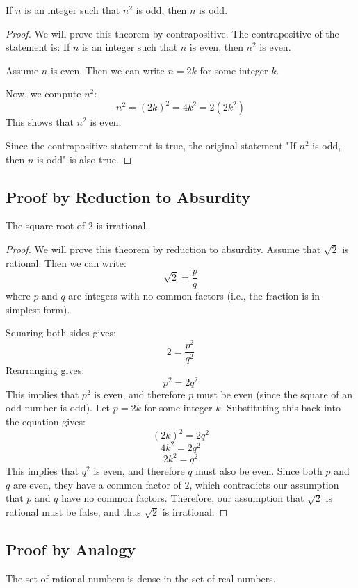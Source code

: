 If \( n \) is an integer such that \( n^2 \) is odd, then \( n \) is odd.

\begin{proof}
	We will prove this theorem by contrapositive. The contrapositive of the statement is: If \( n \) is an integer such that \( n \) is even, then \( n^2 \) is even.

	Assume \( n \) is even. Then we can write \( n = 2k \) for some integer \( k \).

	Now, we compute \( n^2 \):
	\[
		n^2 = (2k)^2 = 4k^2 = 2(2k^2)
	\]
	This shows that \( n^2 \) is even.

	Since the contrapositive statement is true, the original statement "If \( n^2 \) is odd, then \( n \) is odd" is also true.
\end{proof}
\subsection{Proof by Reduction to Absurdity}

The square root of \( 2 \) is irrational.

\begin{proof}
	We will prove this theorem by reduction to absurdity. Assume that \( \sqrt{2} \) is rational. Then we can write:
	\[
		\sqrt{2} = \frac{p}{q}
	\]
	where \( p \) and \( q \) are integers with no common factors (i.e., the fraction is in simplest form).

	Squaring both sides gives:
	\[
		2 = \frac{p^2}{q^2}
	\]
	Rearranging gives:
	\[
		p^2 = 2q^2
	\]
	This implies that \( p^2 \) is even, and therefore \( p \) must be even (since the square of an odd number is odd).
	Let \( p = 2k \) for some integer \( k \). Substituting this back into the equation gives:
	\[
		(2k)^2 = 2q^2
	\]
	\[
		4k^2 = 2q^2
	\]
	\[
		2k^2 = q^2
	\]
	This implies that \( q^2 \) is even, and therefore \( q \) must also be even.
	Since both \( p \) and \( q \) are even, they have a common factor of \( 2 \), which contradicts our assumption that \( p \) and \( q \) have no common factors.
	Therefore, our assumption that \( \sqrt{2} \) is rational must be false, and thus \( \sqrt{2} \) is irrational.
\end{proof}

\subsection{Proof by Analogy}

The set of rational numbers is dense in the set of real numbers.

